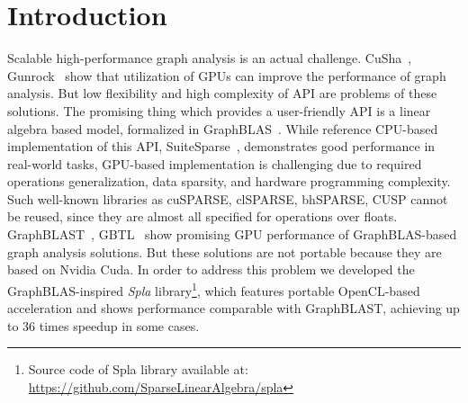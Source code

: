 \section{Introduction}


Scalable high-performance graph analysis is an actual challenge.
CuSha~\cite{10.1145/2600212.2600227}, Gunrock~\cite{7967137} show that utilization of GPUs can improve the performance of graph analysis. But low flexibility and high complexity of API are problems of these solutions. The promising thing which provides a user-friendly API is a linear algebra based model, formalized in GraphBLAS~\cite{7761646}. While reference CPU-based implementation of this API, SuiteSparse~\cite{10.1145/3322125}, demonstrates good performance in real-world tasks, GPU-based implementation is challenging due to required operations generalization, data sparsity, and hardware programming complexity. Such well-known libraries as cuSPARSE, clSPARSE, bhSPARSE, CUSP cannot be reused, since they are almost all specified for operations over floats. GraphBLAST~\cite{yang2019graphblast}, GBTL~\cite{7529957} show promising GPU performance of GraphBLAS-based graph analysis solutions. But these solutions are not portable because they are based on Nvidia Cuda. In order to address this problem we developed the GraphBLAS-inspired \textit{Spla} library\footnote{Source code of Spla library available at: \url{https://github.com/SparseLinearAlgebra/spla}}, which features portable OpenCL-based acceleration and shows performance comparable with GraphBLAST, achieving up to 36 times speedup in some cases.